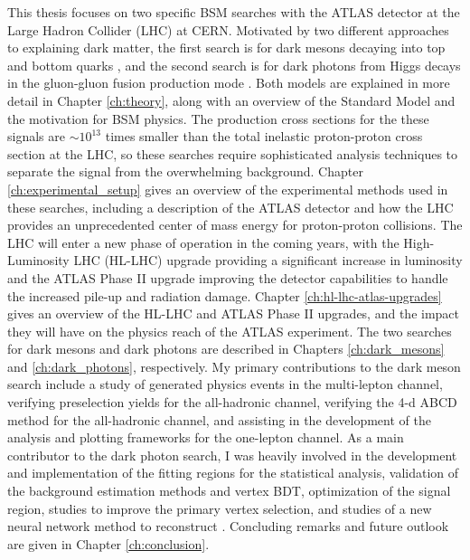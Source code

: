 This thesis focuses on two specific BSM searches with the ATLAS detector at the Large Hadron Collider (LHC) at CERN.
Motivated by two different approaches to explaining dark matter, the first search is for dark mesons decaying into top and bottom quarks \cite{kribs_2019}, and the second search is for dark photons from Higgs decays in the gluon-gluon fusion production mode \cite{Biswas_2022}.
Both models are explained in more detail in Chapter \ref{ch:theory}, along with an overview of the Standard Model and the motivation for BSM physics.
The production cross sections for the these signals are $\sim 10^{13}$ times smaller than the total inelastic proton-proton cross section at the LHC, so these searches require sophisticated analysis techniques to separate the signal from the overwhelming background.
Chapter \ref{ch:experimental_setup} gives an overview of the experimental methods used in these searches, including a description of the ATLAS detector and how the LHC provides an unprecedented center of mass energy for proton-proton collisions.
The LHC will enter a new phase of operation in the coming years, with the High-Luminosity LHC (HL-LHC) upgrade providing a significant increase in luminosity and the ATLAS Phase II upgrade improving the detector capabilities to handle the increased pile-up and radiation damage.
Chapter \ref{ch:hl-lhc-atlas-upgrades} gives an overview of the HL-LHC and ATLAS Phase II upgrades, and the impact they will have on the physics reach of the ATLAS experiment.
The two searches for dark mesons and dark photons are described in Chapters \ref{ch:dark_mesons} and \ref{ch:dark_photons}, respectively.
My primary contributions to the dark meson search include a study of generated physics events in the multi-lepton channel, verifying preselection yields for the all-hadronic channel, verifying the 4-d ABCD method for the all-hadronic channel, and assisting in the development of the analysis and plotting frameworks for the one-lepton channel.
As a main contributor to the dark photon search, I was heavily involved in the development and implementation of the fitting regions for the statistical analysis, validation of the background estimation methods and vertex BDT, optimization of the signal region, studies to improve the primary vertex selection, and studies of a new neural network method to reconstruct \ETmiss.
Concluding remarks and future outlook are given in Chapter \ref{ch:conclusion}.


